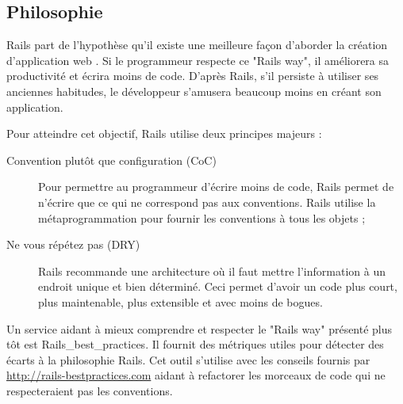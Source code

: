 \subsection{Philosophie}
Rails part de l'hypothèse qu'il existe une meilleure façon d'aborder la création d'application web \cite{rails-guides}. Si le programmeur respecte ce "Rails way", il améliorera sa productivité et écrira moins de code. D'après Rails, s’il persiste à utiliser ses anciennes habitudes, le développeur s'amusera beaucoup moins en créant son application.

Pour atteindre cet objectif, Rails utilise deux principes majeurs :
\begin{description}
  \item[Convention plutôt que configuration (CoC) \cite{wiki-coc}] Pour permettre au programmeur d'écrire moins de code, Rails permet de n'écrire que ce qui ne correspond pas aux conventions. Rails utilise la métaprogrammation pour fournir les conventions à tous les objets ;
  \item[Ne vous répétez  pas (DRY) \cite{wiki-dry}] Rails recommande une architecture où il faut mettre l'information à un endroit unique et bien déterminé. Ceci permet d'avoir un code plus court, plus maintenable, plus extensible et avec moins de bogues.
\end{description}

\label{rbp}
Un service aidant à mieux comprendre et respecter le "Rails way" présenté plus tôt est Rails\_best\_practices. Il fournit des métriques utiles pour détecter des écarts à la philosophie Rails. Cet outil s'utilise avec les conseils fournis par \url{http://rails-bestpractices.com} aidant à refactorer les morceaux de code qui ne respecteraient pas les conventions.

